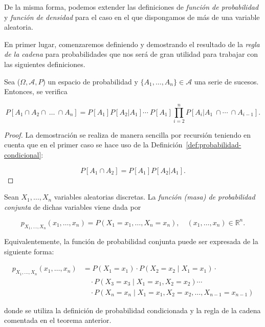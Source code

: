De la misma forma, podemos extender las definiciones de \emph{función de probabilidad} y \emph{función de densidad} para el caso en el que dispongamos de más de una variable aleatoria.\newline

En primer lugar, comenzaremos definiendo y demostrando el resultado de la \emph{regla de la cadena} para probabilidades que nos será de gran utilidad para trabajar con las siguientes definiciones.\newline

\begin{teorema}
    Sea ($\Omega, \mathcal{A}, P$) un espacio de probabilidad y $\{A_1, \ldots, A_n \} \in \mathcal{A}$ una serie de sucesos. Entonces, se verifica

    \[ P[A_1 \cap A_2 \cap \ \ldots \ \cap A_n] =  P[A_1]P[A_2 | A_1]\cdots \ P[A_1]\prod_{i=2}^n P[A_i | A_1 \ \cap \cdots \ \cap A_{i-1}]. \]\newline
\end{teorema}

\begin{proof}
    La demostración se realiza de manera sencilla por recursión teniendo en cuenta que en el primer caso se hace uso de la Definición~\ref{def:probabilidad-condicional}:

    \[ P[A_1 \cap A_2] = P[A_1]P[A_2| A_1]. \]\newline
\end{proof}

\begin{definicion}
    Sean $X_1, \ldots, X_n$ variables aleatorias discretas. La \emph{función (masa) de probabilidad conjunta} de dichas variables viene dada por

    \[ p_{X_1, \ldots, X_n}(x_1, \ldots, x_n) = P(X_1 = x_1, \ldots, X_n = x_n), \quad (x_1, \ldots, x_n) \in \mathbb{R}^n. \]

    Equivalentemente, la función de probabilidad conjunta puede ser expresada de la siguiente forma:

    \begin{align*}
        p_{X_1, \dots, X_n}(x_1, \dots, x_n) &= P(X_1 = x_1) \cdot P(X_2 = x_2 \mid X_1 = x_1) \cdot \\
        &\quad \cdot P(X_3 = x_3 \mid X_1 = x_1, X_2 = x_2) \cdots \\
        &\quad \cdot P(X_n = x_n \mid X_1 = x_1, X_2 = x_2, \dots, X_{n-1} = x_{n-1})
    \end{align*}

    donde se utiliza la definición de probabilidad condicionada y la regla de la cadena comentada en el teorema anterior.\newline
\end{definicion}

